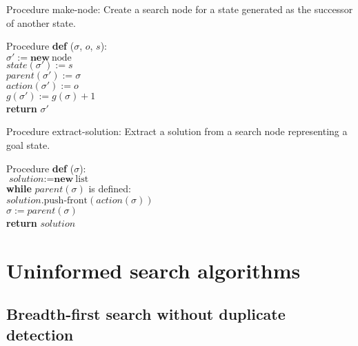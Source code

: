\documentclass{gkibeamer}
\begin{document}
\begin{frame}{Procedure }
  \alert{make-node:} Create a search node for a state generated
  as the successor of another state.
  \begin{block}{Procedure }
    \textbf{def} ($\sigma$, $o$, $s$): \\
    {}\qquad $\sigma' := \textbf{new}~\text{node}$ \\
    {}\qquad $\textit{state}(\sigma') := s$ \\
    {}\qquad $\textit{parent}(\sigma') := \sigma$ \\
    {}\qquad $\textit{action}(\sigma') := o$ \\
    {}\qquad $g(\sigma') := g(\sigma) + 1$ \\
    {}\qquad \textbf{return} $\sigma'$
  \end{block}
\end{frame}

\begin{frame}{Procedure }
  \alert{extract-solution:} Extract a solution from a search
  node representing a goal state.
  \begin{block}{Procedure }
    \textbf{def} ($\sigma$): \\
    {}\qquad $\textit{solution} := \textbf{new}~\text{list}$ \\
    {}\qquad \textbf{while} $\textit{parent}(\sigma)$ is defined: \\
    {}\qquad\qquad
    $\textit{solution}.\text{push-front}(\textit{action}(\sigma))$ \\
    {}\qquad\qquad $\sigma := \textit{parent}(\sigma)$ \\
    {}\qquad \textbf{return} $\textit{solution}$
  \end{block}
\end{frame}

\section[Uninformed search]{Uninformed search algorithms}
\subsection[Breadth-first w/o duplicate detection]{Breadth-first
  search without duplicate detection}
\end{document}
